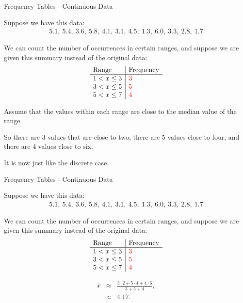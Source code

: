 \begin{frame}{Frequency Tables - Continuous Data}

  Suppose we have this data:
  \begin{eqnarray*}
    5.1,~5.4,~3.6,~5.8,~4.1,~3.1,~4.5,~1.3,~6.0,~3.3,~2.8,~1.7
  \end{eqnarray*}

  We can count the number of occurrences in certain ranges, and
  suppose we are given this summary instead of the original data:
    \begin{eqnarray*}
      \begin{array}{l|l}
        \mathrm{Range}   & \mathrm{Frequency} \\ \hline
        1<x\leq 3 & {\color{red}3} \\
        3<x\leq 5 & {\color{red}5} \\
        5<x\leq 7 & {\color{red}4} \\
      \end{array}
    \end{eqnarray*}

  {
    Assume that the values within each range are close to the median value of the range.

    So there are {\color{red}3} values that are close to two, there
    are {\color{red}5} values close to four, and there are
    {\color{red}4} values close to six.

    It is now just like the discrete case.

  }

  
\end{frame}

\begin{frame}{Frequency Tables - Continuous Data}

  Suppose we have this data:
  \begin{eqnarray*}
    5.1,~5.4,~3.6,~5.8,~4.1,~3.1,~4.5,~1.3,~6.0,~3.3,~2.8,~1.7
  \end{eqnarray*}

  We can count the number of occurrences in certain ranges, and
  suppose we are given this summary instead of the original data:
    \begin{eqnarray*}
      \begin{array}{l|l}
        \mathrm{Range}   & \mathrm{Frequency} \\ \hline
        1<x\leq 3 & {\color{red}3} \\
        3<x\leq 5 & {\color{red}5} \\
        5<x\leq 7 & {\color{red}4} \\
      \end{array}
    \end{eqnarray*}

    \begin{eqnarray*}
      \bar{x} & \approx & \frac{3\cdot 2 + 5 \cdot 4 + 4 \cdot 6}{3+5+4}, \\
      & \approx & 4.17.
    \end{eqnarray*}

  
\end{frame}


